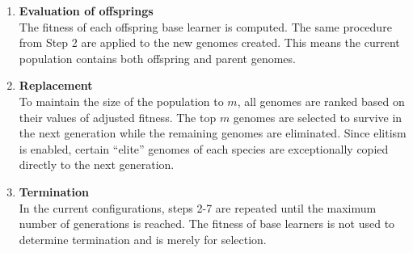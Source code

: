 \begin{enumerate}
    \begin{equation}
        \label{equation:neat_ncl_dynamic_lambda}
        \lambda = \lambda_{max} - \frac{D}{D_{max}} \times (\lambda_{max} - \lambda_{min})
    \end{equation}

    where $\lambda_{max}$ and $\lambda_{min}$ correspond to the upper and lower bounds values of $\lambda$ set by developers ($0.1$ and $0.9$ respectively). Thus, $\lambda$ varies from $\lambda_{min}$ to $\lambda_{max}$. $D$ is the population diversity computed in the current population. $D_{max}$ is the maximum population diversity recorded in the population. 

    Equation~\ref{equation:neat_ncl_dynamic_lambda} requires $D$, which is dynamically computed (refer to Section~\ref{subsubsec:neat_ncl_population_diversity} for the calculation steps). Based on Equation~\ref{equation:neat_ncl_dynamic_lambda}, $\lambda$ is set to a very large number initially (because the initial population has little diversity, i.e. small $D$) and it is decreased gradually until it reaches its optimal value. In other words, diversity of base learners is prioritised at the beginning but accuracy receives more attention as there are more diverse genomes in the population. 

    \item \textbf{Evaluation of offsprings} \\
    The fitness of each offspring base learner is computed. The same procedure from Step 2 are applied to the new genomes created. This means the current population contains both offspring and parent genomes. 

    \item \textbf{Replacement} \\
    To maintain the size of the population to $m$, all genomes are ranked based on their values of adjusted fitness. The top $m$ genomes are selected to survive in the next generation while the remaining genomes are eliminated. Since elitism is enabled, certain ``elite'' genomes of each species are exceptionally copied directly to the next generation. 

    \item \textbf{Termination} \\
    In the current configurations, steps 2-7 are repeated until the maximum number of generations is reached. The fitness of base learners is not used to determine termination and is merely for selection. 
\end{enumerate}


